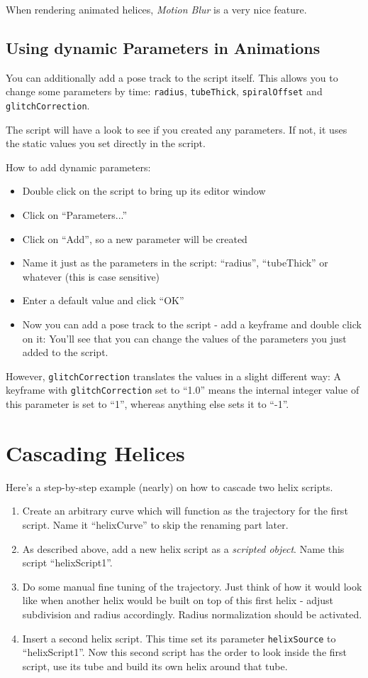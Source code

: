 \documentclass[12pt,a4paper]{scrartcl}
\begin{document}
When rendering animated helices, \emph{Motion Blur} is a very nice
feature.

\subsection{Using dynamic Parameters in Animations}
You can additionally add a pose track to the script itself. This allows
you to change some parameters by time: \texttt{radius},
\texttt{tubeThick}, \texttt{spiralOffset} and \texttt{glitchCorrection}.

The script will have a look to see if you created any parameters. If not,
it uses the static values you set directly in the script.

How to add dynamic parameters:
\begin{itemize}
	\item Double click on the script to bring up its editor window
	\item Click on ``Parameters...''
	\item Click on ``Add'', so a new parameter will be created
	\item Name it just as the parameters in the script: ``radius'',
		``tubeThick'' or whatever (this is case sensitive)
	\item Enter a default value and click ``OK''
	\item Now you can add a pose track to the script - add a keyframe
		and double click on it: You'll see that you can change the
		values of the parameters you just added to the script.
\end{itemize}

However, \texttt{glitchCorrection} translates the values in a slight
different way: A keyframe with \texttt{glitchCorrection} set to ``1.0''
means the internal integer value of this parameter is set to ``1'',
whereas anything else sets it to ``-1''.

\section{Cascading Helices}
Here's a step-by-step example (nearly) on how to cascade two helix
scripts.

\begin{enumerate}
	\item Create an arbitrary curve which will function as the trajectory
		for the first script. Name it ``helixCurve'' to skip the renaming
		part later.
	\item As described above, add a new helix script as a
		\emph{scripted object}. Name this script ``helixScript1''.
	\item Do some manual fine tuning of the trajectory. Just think of
		how it would look like when another helix would be built on
		top of this first helix - adjust subdivision and radius
		accordingly. Radius normalization should be activated.
	\item Insert a second helix script. This time set its parameter
		\texttt{helixSource} to ``helixScript1''. Now this second script
		has the order to look inside the first script, use its tube
		and build its own helix around that tube.
\end{enumerate}
\end{document}
